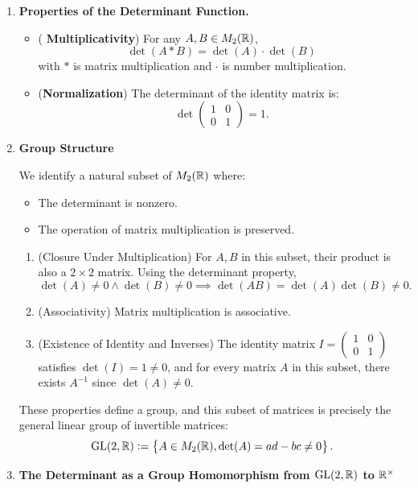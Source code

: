 \documentclass[11pt,openany]{article}
\begin{document}
\begin{example}[Determinant]
\begin{enumerate}
	The set $M_2(\R)$ is the set of all $2\times 2$ matrices with real entries: \[
	M_2(\R):=\set{\begin{pmatrix}
		a & b \\ c & d
	\end{pmatrix}:a,b,c,d\in\R}.
	\] The determinant is a function: \[
	\fullfunction{\det}{M_2(\R)}{\R}{A}{\det(A)=ad-bc\in\R}
	\] for each $A=\begin{pmatrix}
		a & b \\ c & d
	\end{pmatrix}\in M_2(\R)$. This function assigns a real number to each $2\times 2$ matrix.
	\item \textbf{\large Properties of the Determinant Function.}
	\begin{itemize}
		\item (\textbf{\color{red} Multiplicativity}) For any $A,B\in M_2(\mathbb{R})$, \[
		\det(A*B)=\det(A)\cdot\det(B)
		\] with $*$ is matrix multiplication and $\cdot$ is number multiplication.
		\item (\textbf{Normalization}) The determinant of the identity matrix is: \[
		\det\begin{pmatrix}
			1 & 0 \\ 0 & 1
		\end{pmatrix}=1.
		\]
	\end{itemize}
	\item \textbf{\large Group Structure}
	
	We identify a natural subset of $M_2(\R)$ where: \begin{itemize}
		\item The determinant is nonzero.
		\item  The operation of matrix multiplication is preserved.
	\end{itemize}
	\begin{enumerate}[1.]
		\item (Closure Under Multiplication) For $A,B$ in this subset, their product is also a $2\times 2$ matrix. Using the determinant property, \[
		\det(A)\neq 0\land \det(B)\neq 0\implies \det(AB)=\det(A)\det(B)\neq 0.
		\]
		\item (Associativity) Matrix multiplication is associative.
		\item (Existence of Identity and Inverses) The identity matrix $I=\begin{pmatrix}
			1 & 0 \\ 0 & 1
		\end{pmatrix}$ satisfies $\det(I)=1\neq 0$, and for every matrix $A$ in this subset, there exists $A^{-1}$ since $\det(A)\neq 0$.
	\end{enumerate}
	These properties define a group, and this subset of matrices is precisely the general linear group of invertible matrices: \[
	\text{GL}(2,\mathbb{R}):=\set{A\in M_2(\mathbb{R}),\det(A)=ad-bc\neq 0}.
	\]
	\vfill
	\item \textbf{\large The Determinant as a Group Homomorphism from $\text{GL}(2,\mathbb{R})$ to $\mathbb{R}^\times$}
	

\end{enumerate}
\end{example}
\end{document}
